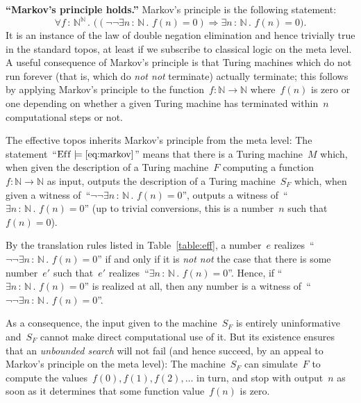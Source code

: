 \documentclass[graybox]{svmult}
\newcommand{\NN}{\mathbb{N}}
\newcommand{\Eff}{\mathrm{Ef{}f}}
\renewcommand{\_}{\mathpunct{.}\,}
\newcommand{\effective}{ef{}fective\xspace}
\newcommand{\?}{\,{:}\,}
\begin{document}
\begin{example}\textbf{``Markov's principle holds.''} Markov's principle is the
following statement:
\begin{equation}\label{eq:markov}\tag{MP}
  \forall f \? \NN^\NN\_ \bigl((\neg\neg\exists n\?\NN\_ f(n) = 0)
  \Longrightarrow \exists n\?\NN\_ f(n) = 0\bigr).
\end{equation}
It is an instance of the law of double negation elimination and hence trivially
true in the standard topos, at least if we subscribe to classical logic on the
meta level. A useful consequence of Markov's principle is that Turing machines
which do not run forever (that is, which do \emph{not not} terminate) actually
terminate; this follows by applying Markov's principle to the function~$f : \NN
\to \NN$ where~$f(n)$ is zero or one depending on whether a given Turing
machine has terminated within~$n$ computational steps or not.

The \effective topos inherits Markov's principle from the meta level:
The statement~``$\Eff \models \text{\eqref{eq:markov}}$'' means that there is a
Turing machine~$M$ which, when given the description of a Turing machine~$F$
computing a function~$f : \NN \to \NN$ as input, outputs the description of a Turing
machine~$S_F$ which, when given a witness of~``$\neg\neg \exists n\?\NN\_ f(n)
= 0$'', outputs a witness of~``$\exists n\?\NN\_ f(n) = 0$'' (up to trivial
conversions, this is a number~$n$ such that~$f(n) = 0$).

By the translation rules listed in Table~\ref{table:eff}, a number~$e$
realizes~``$\neg\neg \exists n\?\NN\_ f(n) = 0$'' if and only if it is
\emph{not not} the case that there is some number~$e'$ such that~$e'$
realizes~``$\exists n\?\NN\_ f(n) = 0$''. Hence, if ``$\exists n\?\NN\_ f(n) =
0$'' is realized at all, then any number is a witness of~``$\neg\neg
\exists n\?\NN\_ f(n) = 0$''.

As a consequence, the input given to the machine~$S_F$ is entirely uninformative
and~$S_F$ cannot make direct computational use of it. But its existence ensures that an
\emph{unbounded search} will not fail (and hence succeed, by an appeal to Markov's
principle on the meta level): The machine~$S_F$ can simulate~$F$ to
compute the values~$f(0), f(1), f(2), \ldots$ in turn, and stop
with output~$n$ as soon as it determines that some function value~$f(n)$ is zero.
\end{example}
\end{document}
